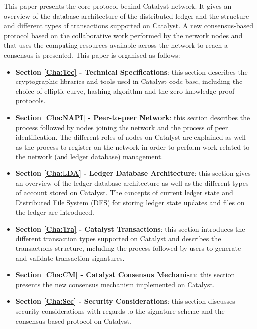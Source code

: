 This paper presents the core protocol behind Catalyst network. It gives an overview of the database architecture of the distributed ledger and the structure and different types of transactions supported on Catalyst. A new consensus-based protocol based on the collaborative work performed by the network nodes and that uses the computing resources available across the network to reach a consensus is presented. This paper is organised as follows:

\begin{itemize}
\item \textbf{Section \ref{Cha:Tec} - Technical Specifications}: this section describes the cryptographic libraries and tools used in Catalyst code base, including the choice of elliptic curve, hashing algorithm and the zero-knowledge proof protocols. 

\item \textbf{Section \ref{Cha:NAPI} - Peer-to-peer Network}: this section describes the process followed by nodes joining the network and the process of peer identification. The different roles of nodes on Catalyst are explained as well as the process to register on the network in order to perform work related to the network (and ledger database) management. 

\item \textbf{Section \ref{Cha:LDA} - Ledger Database Architecture}: this section gives an overview of the ledger database architecture as well as the different types of account stored on Catalyst. The concepts of current ledger state and Distributed File System (DFS) for storing ledger state updates and files on the ledger are introduced. 

\item \textbf{Section \ref{Cha:Tra} - Catalyst Transactions}: this section introduces the different transaction types supported on Catalyst and describes the transactions structure, including the process followed by users to generate and validate transaction signatures. 

\item \textbf{Section \ref{Cha:CM} - Catalyst Consensus Mechanism}: this section presents the new consensus mechanism implemented on Catalyst. 



\item \textbf{Section \ref{Cha:Sec} - Security Considerations}: this section discusses security considerations with regards to the signature scheme and the consensus-based protocol on Catalyst. 

\end{itemize}